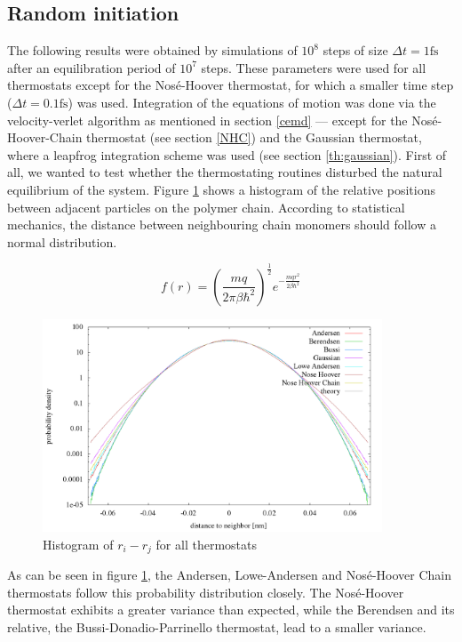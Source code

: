 % 
\graphicspath{{../graphics/}}


\subsection{Random initiation}
The following results were obtained by simulations of $10^8$ steps of size $\Delta t = 1 \text{fs}$ after an equilibration period of $10^7$ steps. These parameters were used for all thermostats except for the Nosé-Hoover thermostat, for which a smaller time step ($\Delta t = 0.1 \text{fs}$) was used. Integration of the equations of motion was done via the velocity-verlet algorithm as mentioned in section \ref{cemd} --- except for the Nosé-Hoover-Chain thermostat (see section \ref{NHC}) and the Gaussian thermostat, where a leapfrog integration scheme was used (see section \ref{th:gaussian}).   
First of all, we wanted to test whether the thermostating routines disturbed the natural equilibrium of the system. Figure \ref{im:relPos_rand} shows a histogram of the relative positions between adjacent particles on the polymer chain. According to statistical mechanics, the distance between neighbouring chain monomers should follow a normal distribution.

\begin{equation}
f(r) = \left(\frac{mq}{2\pi\beta\hbar^2}\right)^{\frac{1}{2}}e^{-\frac{mqr^2}{2\beta\hbar^2}}
\end{equation}  

\begin{figure}[H]
\centering
\includegraphics[width=0.9\textwidth]{./graphics/Histogramm_relPos_rand_T=20_p=64.png}
\caption{Histogram of $r_i - r_j$ for all thermostats}
\label{im:relPos_rand}
\end{figure} 
As can be seen in figure \ref{im:relPos_rand}, the Andersen, Lowe-Andersen and Nosé-Hoover Chain thermostats follow this probability distribution closely. The Nosé-Hoover thermostat exhibits a greater variance than expected, while the Berendsen and its relative, the Bussi-Donadio-Parrinello thermostat,  lead to a smaller variance. 

